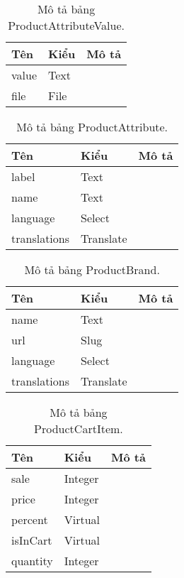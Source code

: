 \begin{table}[p]
	\begin{center}
		\begin{tabular}{ |l|l|l| } 
			\hline
			Tên & Kiểu & Mô tả \\
			\hline
			value & Text & \dotfill \\
			file & File & \dotfill \\ 
			\hline
		\end{tabular}
		\caption{Mô tả bảng ProductAttributeValue.}
		\label{table:ProductAttributeValue}
	\end{center}
\end{table}


\begin{table}[p]
	\begin{center}
		\begin{tabular}{ |l|l|l| } 
			\hline
			Tên & Kiểu & Mô tả \\
			\hline
			label & Text & \dotfill \\
			name & Text & \dotfill \\
			language & Select & \dotfill \\
			translations & Translate & \dotfill \\ 
			\hline
		\end{tabular}
		\caption{Mô tả bảng ProductAttribute.}
		\label{table:ProductAttribute}
	\end{center}
\end{table}


\begin{table}[p]
	\begin{center}
		\begin{tabular}{ |l|l|l| } 
			\hline
			Tên & Kiểu & Mô tả \\
			\hline
			name & Text & \dotfill \\
			url & Slug & \dotfill \\
			language & Select & \dotfill \\
			translations & Translate & \dotfill \\ 
			\hline
		\end{tabular}
		\caption{Mô tả bảng ProductBrand.}
		\label{table:ProductBrand}
	\end{center}
\end{table}


\begin{table}[p]
	\begin{center}
		\begin{tabular}{ |l|l|l| } 
			\hline
			Tên & Kiểu & Mô tả \\
			\hline
			sale & Integer & \dotfill \\
			price & Integer & \dotfill \\
			percent & Virtual & \dotfill \\
			isInCart & Virtual & \dotfill \\
			quantity & Integer & \dotfill \\ 
			\hline
		\end{tabular}
		\caption{Mô tả bảng ProductCartItem.}
		\label{table:ProductCartItem}
	\end{center}
\end{table}



